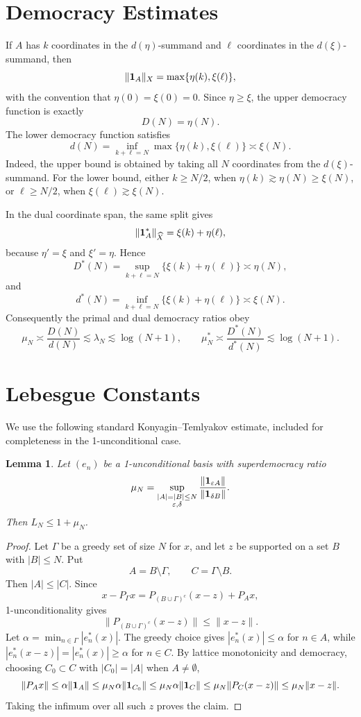 \documentclass[11pt]{article}
\newtheorem{lemma}{Lemma}
\newcommand{\eps}{\varepsilon}
\begin{document}
\section{Democracy Estimates}

If \(A\) has \(k\) coordinates in the \(d(\eta)\)-summand and \(\ell\)
coordinates in the \(d(\xi)\)-summand, then
\[
   \|{\bf 1}_A\|_X=\max\{\eta(k),\xi(\ell)\},
\]
with the convention that \(\eta(0)=\xi(0)=0\).  Since \(\eta\ge \xi\), the
upper democracy function is exactly
\[
   D(N)=\eta(N).
\]
The lower democracy function satisfies
\[
   d(N)=\inf_{k+\ell=N}\max\{\eta(k),\xi(\ell)\}\asymp \xi(N).
\]
Indeed, the upper bound is obtained by taking all \(N\) coordinates from the
\(d(\xi)\)-summand.  For the lower bound, either \(k\ge N/2\), when
\(\eta(k)\gtrsim \eta(N)\ge \xi(N)\), or \(\ell\ge N/2\), when
\(\xi(\ell)\gtrsim \xi(N)\).

In the dual coordinate span, the same split gives
\[
   \|{\bf 1}_A^*\|_{\widehat X}
      = \xi(k)+\eta(\ell),
\]
because \(\eta'= \xi\) and \(\xi'=\eta\).  Hence
\[
   D^*(N)=\sup_{k+\ell=N}\{\xi(k)+\eta(\ell)\}\asymp \eta(N),
\]
and
\[
   d^*(N)=\inf_{k+\ell=N}\{\xi(k)+\eta(\ell)\}\asymp \xi(N).
\]
Consequently the primal and dual democracy ratios obey
\[
   \mu_N\asymp \frac{D(N)}{d(N)}\lesssim \lambda_N\lesssim \log(N+1),
   \qquad
   \mu_N^*\asymp \frac{D^*(N)}{d^*(N)}\lesssim \log(N+1).
\]

\section{Lebesgue Constants}

We use the following standard Konyagin--Temlyakov estimate, included for
completeness in the 1-unconditional case.

\begin{lemma}
\label{lem:unconditional-lebesgue}
Let \((e_n)\) be a 1-unconditional basis with superdemocracy ratio
\[
  \mu_N=\sup_{\substack{|A|=|B|\le N\\ \eps,\delta}}
  \frac{\|{\bf 1}_{\eps A}\|}{\|{\bf 1}_{\delta B}\|}.
\]
Then \(L_N\le 1+\mu_N\).
\end{lemma}

\begin{proof}
Let \(\Gamma\) be a greedy set of size \(N\) for \(x\), and let
\(z\) be supported on a set \(B\) with \(|B|\le N\).  Put
\[
   A=B\setminus \Gamma,\qquad C=\Gamma\setminus B.
\]
Then \(|A|\le |C|\).  Since
\[
   x-P_\Gamma x=P_{(B\cup\Gamma)^c}(x-z)+P_Ax,
\]
1-unconditionality gives
\[
   \|P_{(B\cup\Gamma)^c}(x-z)\|\le \|x-z\|.
\]
Let \(\alpha=\min_{n\in \Gamma}|e_n^*(x)|\).  The greedy choice gives
\(|e_n^*(x)|\le \alpha\) for \(n\in A\), while
\(|e_n^*(x-z)|=|e_n^*(x)|\ge \alpha\) for \(n\in C\).  By lattice
monotonicity and democracy, choosing \(C_0\subset C\) with
\(|C_0|=|A|\) when \(A\ne\emptyset\),
\[
   \|P_Ax\|\le \alpha\|{\bf 1}_A\|
       \le \mu_N\alpha\|{\bf 1}_{C_0}\|
       \le \mu_N\alpha\|{\bf 1}_C\|
       \le \mu_N\|P_C(x-z)\|
       \le \mu_N\|x-z\|.
\]
Taking the infimum over all such \(z\) proves the claim.
\end{proof}
\end{document}

